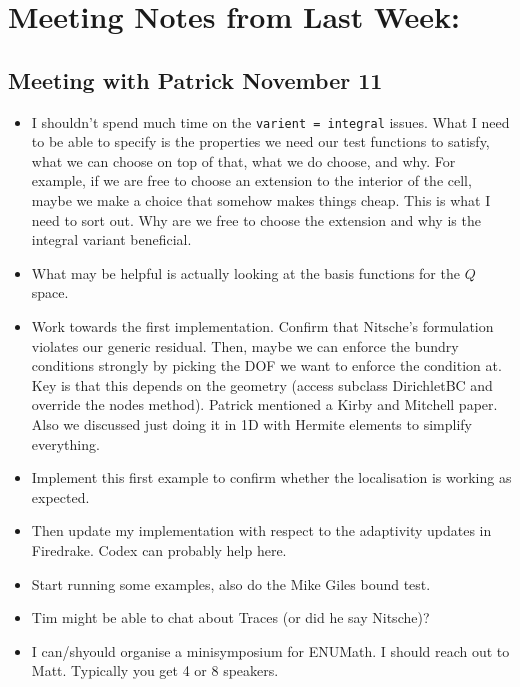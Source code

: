 \documentclass[12pt,a4paper]{article}
\begin{document}
\newpage 

\section{Meeting Notes from Last Week:}

\subsection{Meeting with Patrick November 11}

\begin{itemize}
    \item I shouldn't spend much time on the \texttt{varient = integral} issues. What I need to be able to specify is the properties we need our test functions to satisfy, what we can choose on top of that, what we do choose, and why. For example, if we are free to choose an extension to the interior of the cell, maybe we make a choice that somehow makes things cheap. This is what I need to sort out. Why are we free to choose the extension and why is the integral variant beneficial. 
    \item What may be helpful is actually looking at the basis functions for the $Q$ space. 
    \item Work towards the first implementation. Confirm that Nitsche's formulation violates our generic residual. Then, maybe we can enforce the bundry conditions strongly by picking the DOF we want to enforce the condition at. Key is that this depends on the geometry (access subclass DirichletBC and override the nodes method). Patrick mentioned a Kirby and Mitchell paper. Also we discussed just doing it in 1D with Hermite elements to simplify everything. 
    \item Implement this first example to confirm whether the localisation is working as expected. 
    \item Then update my implementation with respect to the adaptivity updates in Firedrake. Codex can probably help here.
    \item Start running some examples, also do the Mike Giles bound test. 
    \item Tim might be able to chat about Traces (or did he say Nitsche)? 
    \item I can/shyould  organise a minisymposium for ENUMath. I should reach out to Matt. Typically you get 4 or 8 speakers. 
\end{itemize}

\end{document}
